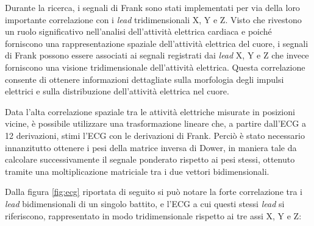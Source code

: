 \documentclass[12pt,italian]{report}
\begin{document}
	Durante la ricerca, i segnali di Frank sono stati implementati per via della loro importante correlazione con i \textit{lead} tridimensionali X, Y e Z. Visto che rivestono un ruolo significativo nell'analisi dell'attività elettrica cardiaca e poiché forniscono una rappresentazione spaziale dell'attività elettrica del cuore, i segnali di Frank possono essere associati ai segnali registrati dai \textit{lead} X, Y e Z che invece forniscono una visione tridimensionale dell'attività elettrica. Questa correlazione consente di ottenere informazioni dettagliate sulla morfologia degli impulsi elettrici e sulla distribuzione dell'attività elettrica nel cuore.
	
	Data l'alta correlazione spaziale tra le attività elettriche misurate in posizioni vicine, è possibile utilizzare una trasformazione lineare che, a partire dall'ECG a 12 derivazioni, stimi l'ECG con le derivazioni di Frank. Perciò è stato necessario innanzitutto ottenere i pesi della matrice inversa di Dower, in maniera tale da calcolare successivamente il segnale ponderato rispetto ai pesi stessi, ottenuto tramite una moltiplicazione matriciale tra i due vettori bidimensionali.
	
	Dalla figura \ref{fig:ecg} riportata di seguito si può notare la forte correlazione tra i \textit{lead} bidimensionali di un singolo battito, e l'ECG a cui questi stessi \textit{lead} si riferiscono, rappresentato in modo tridimensionale rispetto ai tre assi X, Y e Z:
	
\end{document}
